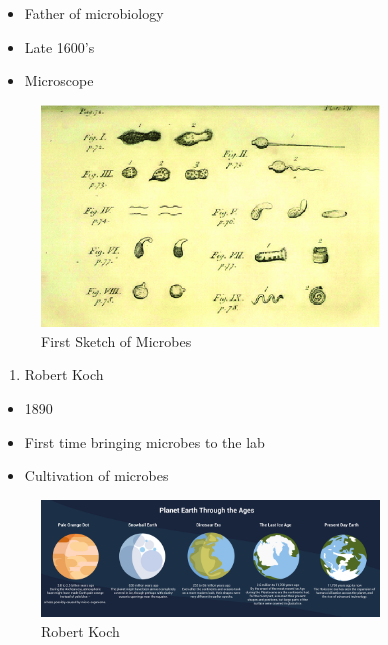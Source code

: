 \documentclass[
]{book}
\providecommand{\tightlist}{%
  \setlength{\itemsep}{0pt}\setlength{\parskip}{0pt}}
\begin{document}
\begin{itemize}
\tightlist
\item
  Father of microbiology
\item
  Late 1600's
\item
  Microscope
\end{itemize}

\begin{figure}
\centering
\includegraphics[width=0.8\textwidth,height=\textheight]{./Figures/leeuwenhoeck.png}
\caption{First Sketch of Microbes}
\end{figure}

\begin{enumerate}
\def\labelenumi{\arabic{enumi}.}
\setcounter{enumi}{1}
\tightlist
\item
  Robert Koch
\end{enumerate}

\begin{itemize}
\tightlist
\item
  1890
\item
  First time bringing microbes to the lab
\item
  Cultivation of microbes
\end{itemize}

\begin{figure}
\centering
\includegraphics[width=0.8\textwidth,height=\textheight]{./Figures/Planets.png}
\caption{Robert Koch}
\end{figure}
\end{document}
